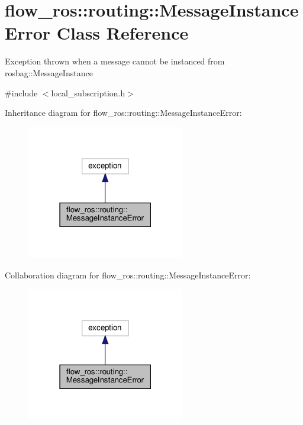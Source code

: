 \hypertarget{classflow__ros_1_1routing_1_1_message_instance_error}{}\section{flow\+\_\+ros\+:\+:routing\+:\+:Message\+Instance\+Error Class Reference}
\label{classflow__ros_1_1routing_1_1_message_instance_error}


Exception thrown when a message cannot be instanced from {\ttfamily rosbag\+::\+Message\+Instance}  




{\ttfamily \#include $<$local\+\_\+subscription.\+h$>$}



Inheritance diagram for flow\+\_\+ros\+:\+:routing\+:\+:Message\+Instance\+Error\+:\nopagebreak
\begin{figure}[H]
\begin{center}
\leavevmode
\includegraphics[width=195pt]{classflow__ros_1_1routing_1_1_message_instance_error__inherit__graph}
\end{center}
\end{figure}


Collaboration diagram for flow\+\_\+ros\+:\+:routing\+:\+:Message\+Instance\+Error\+:\nopagebreak
\begin{figure}[H]
\begin{center}
\leavevmode
\includegraphics[width=195pt]{classflow__ros_1_1routing_1_1_message_instance_error__coll__graph}
\end{center}
\end{figure}
